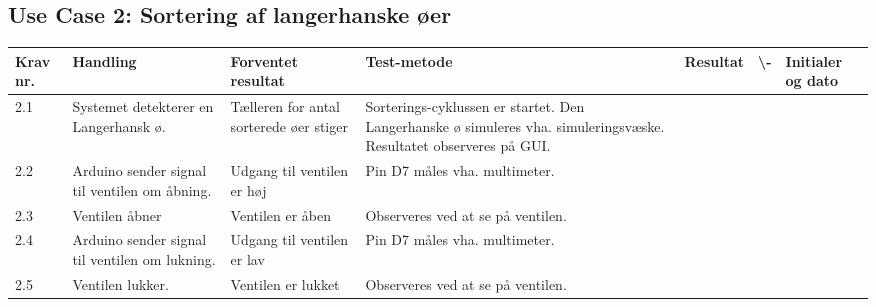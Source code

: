  \subsection{Use Case 2: Sortering af langerhanske øer}
\begin{center}
		\begin{longtable}{ | m{1.785cm} | m{1.785cm}| m{1.785cm}| m{1.785cm}| m{1.785cm}| m{1.785cm}|m{1.785cm}| } 
			\hline
			\textbf{Krav nr.} &\textbf{ Handling} & \textbf{Forventet resultat} & \textbf{Test-metode} &\textbf{Resultat} & \textbf{ \checkmark \textbackslash -} & \textbf{Initialer og dato} \\ 
			
			\hline
			2.1 &  Systemet detekterer en Langerhansk ø. & Tælleren for antal sorterede øer stiger & Sorterings-cyklussen er startet. Den Langerhanske ø simuleres vha. simuleringsvæske. Resultatet observeres på GUI.  &  & & \\
			\hline
			
			\hline
			2.2 &  Arduino sender signal til ventilen om åbning. & Udgang til ventilen er høj & Pin D7 måles vha. multimeter. &  & & \\
			\hline
			
			2.3 &  Ventilen åbner  & Ventilen er åben & Observeres ved at se på ventilen.  &  & & \\
			\hline
			
			2.4 &  Arduino sender signal til ventilen om lukning.  & Udgang til ventilen er lav & Pin D7 måles vha. multimeter.  &  & & \\
			\hline
			
			2.5 &  Ventilen lukker. & Ventilen er lukket & Observeres ved at se på ventilen. &  & & \\
			\hline
			
			
		\end{longtable}
		
	\end{center}
	\pagebreak